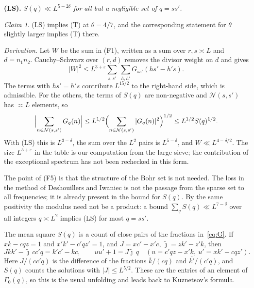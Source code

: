 \documentclass[11pt]{amsart}
\theoremstyle{definition}
\theoremstyle{remark}
\newtheorem{claim}[theorem]{Claim}
\numberwithin{equation}{section}
\newcommand{\eps}{\varepsilon}
\newcommand{\inv}[1]{\overline{#1}}
\begin{document}
\noindent\textbf{(LS).}  \emph{$S(q)\ll L^{5-2\delta}$ for all but a
negligible set of $q=ss'$.}

\begin{claim}\label{claim:LS}
(LS) implies (T) at $\theta=4/7$, and the corresponding statement for
$\theta$ slightly larger implies (T) there.
\end{claim}

\emph{Derivation.}  Let $W$ be the sum in (F1), written as a sum over
$r,s\asymp L$ and $d=n_1n_2$.  Cauchy--Schwarz over $(r,d)$ removes the
divisor weight on $d$ and gives
\[
 |W|^2\le L^{3+\eps}\sum_{s,s'}\ \sum_{h,h'}G_{ss'}(hs'-h's).
\]
The terms with $hs'=h's$ contribute $L^{15/2}$ to the right-hand side,
which is admissible.  For the others, the terms of $S(q)$ are non-negative
and $\mathcal N(s,s')$ has $\asymp L$ elements, so
\[
 \Bigl|\sum_{n\in\mathcal N(s,s')}G_q(n)\Bigr|
 \le L^{1/2}\Bigl(\sum_{n\in\mathcal N(s,s')}|G_q(n)|^2\Bigr)^{1/2}
 \le L^{1/2}S(q)^{1/2}.
\]
With (LS) this is $L^{3-\delta}$, the sum over the $L^2$ pairs is
$L^{5-\delta}$, and $W\ll L^{4-\delta/2}$.  The size $L^{5+\eps}$ in the
table is our computation from the large sieve; the contribution of the
exceptional spectrum has not been rechecked in this form.

\medskip
The point of (F5) is that the structure of the Bohr set is not needed.  The
loss in the method of Deshouillers and Iwaniec is not the passage from the
sparse set to all frequencies; it is already present in the bound for
$S(q)$.  By the same positivity the modulus need not be a product: a bound
$\sum_qS(q)\ll L^{7-\delta}$ over all integers $q\asymp L^2$ implies (LS)
for most $q=ss'$.

The mean square $S(q)$ is a count of close pairs of the fractions
in~\eqref{eq:G}.  If $xk-cqz=1$ and $x'k'-c'qz'=1$, and $J=xc'-x'c$,
$\tilde\jmath=zk'-z'k$, then
\[
 Jkk'-\tilde\jmath\,cc'q=k'c'-kc,\qquad
 uu'+1=J\tilde\jmath\,q\quad(u=c'qz-x'k,\ u'=xk'-cqz').
\]
Here $J/(cc'q)$ is the difference of the fractions $\inv k/(cq)$ and
$\inv{k'}/(c'q)$, and $S(q)$ counts the solutions with $|J|\le L^{5/2}$.
These are the entries of an element of $\Gamma_0(q)$, so this is the usual
unfolding and leads back to Kuznetsov's formula.
\end{document}
